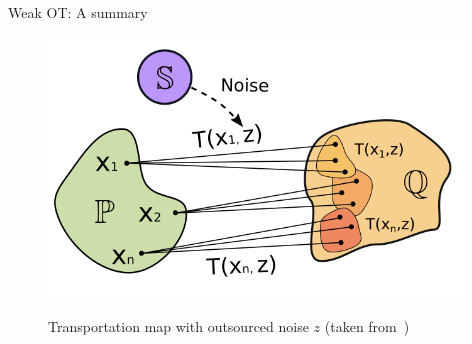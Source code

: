 \documentclass{beamer}
\begin{document}
\begin{frame}{Weak OT: A summary}
    \begin{figure}
        \centering
        \includegraphics[width=0.9\linewidth]{figures/transportation-plan.png}
        \label{transportation-map}
        \caption{Transportation map with outsourced noise $z$ (taken from~\cite{korotin-2022})}
    \end{figure}
\end{frame}
\end{document}
